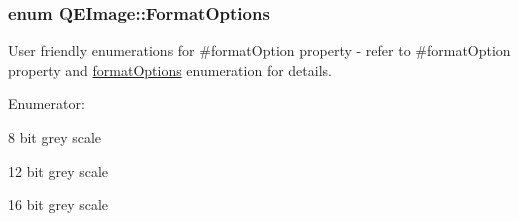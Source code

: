 \hypertarget{classQEImage_a6595b537ab12bff146c508d0fcb3ae3b}{
\subsubsection[{FormatOptions}]{\setlength{\rightskip}{0pt plus 5cm}enum {\bf QEImage::FormatOptions}}}
\label{classQEImage_a6595b537ab12bff146c508d0fcb3ae3b}
User friendly enumerations for \#formatOption property -\/ refer to \#formatOption property and \hyperlink{classQEImage_aec1df5ac4b48c529744b48de7722c55e}{formatOptions} enumeration for details. \begin{Desc}
\item[Enumerator: ]\par
\begin{description}
\item[{\em 
\hypertarget{classQEImage_a6595b537ab12bff146c508d0fcb3ae3ba6215820fb4dfe69742dfecc1f8c89c97}{
Grey\_\-8}
\label{classQEImage_a6595b537ab12bff146c508d0fcb3ae3ba6215820fb4dfe69742dfecc1f8c89c97}
}]8 bit grey scale \item[{\em 
\hypertarget{classQEImage_a6595b537ab12bff146c508d0fcb3ae3ba436edf8896bf0e162afaf8e7b0aafe03}{
Grey\_\-12}
\label{classQEImage_a6595b537ab12bff146c508d0fcb3ae3ba436edf8896bf0e162afaf8e7b0aafe03}
}]12 bit grey scale \item[{\em 
\hypertarget{classQEImage_a6595b537ab12bff146c508d0fcb3ae3baa002305c1b6235b4d2db5928b8a0a69f}{
Grey\_\-16}
\label{classQEImage_a6595b537ab12bff146c508d0fcb3ae3baa002305c1b6235b4d2db5928b8a0a69f}
}]16 bit grey scale \end{description}
\end{Desc}

